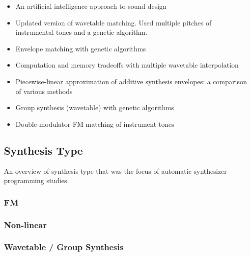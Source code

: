 \begin{itemize}
	\item \cite{miranda1995artificial} An artificial intelligence approach to sound design
	\item \cite{horner1995wavetable} Updated version of wavetable matching. Used multiple pitches of instrumental tones and a genetic algorithm.
	\item \cite{horner1995envelope} Envelope matching with genetic algorithms
	\item \cite{horner1996computation} Computation and memory tradeoffs with multiple wavetable interpolation
	\item \cite{horner1996piecewise} Piecewise-linear approximation of additive synthesis envelopes: a comparison of various methods
	\item \cite{cheung1996group} Group synthesis (wavetable) with genetic algorithms
	\item \cite{horner1996double} Double-modulator FM matching of instrument tones
\end{itemize}


\subsection{Synthesis Type}
An overview of synthesis type that was the focus of automatic synthesizer programming studies.

\subsubsection{FM}
\cite{justice1979analytic}\cite{beauchamp1982synthesis}\cite{payne1987microcomputer}\cite{horner1993machine}\cite{horner1996double}\cite{tan1996automated}\cite{delprat1997global}\cite{lim1999performance}\cite{tan2003automated}
\cite{mitchell2005frequency}\cite{mitchell2007evolutionary}\cite{clement2011automatic}\cite{roth2011comparison}\cite{macret2012automatic}\cite{hamadicharef2012intelligent}\cite{barkan2019deep}

\subsubsection{Non-linear}
\cite{beauchamp1982synthesis}\cite{delprat1990parameter}

\subsubsection{Wavetable / Group Synthesis}
\cite{horner1993methods}\cite{horner1995wavetable}\cite{horner1995envelope}\cite{horner1996computation}\cite{horner1996piecewise}\cite{cheung1996group}\cite{oates1997analytical}\cite{horner1998modeling}\cite{lee1999modeling}\cite{so2002wavetable}

